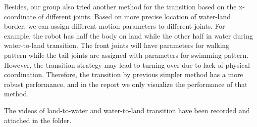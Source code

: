 \documentclass{cmc}
\begin{document}
Besides, our group also tried another method for the transition based on the x-coordinate of different joints. Based on more precise location of water-land border, we can assign different motion parameters to different joints. For example, the robot has half the body on land while the other half in water during water-to-land transition. The front joints will have parameters for walking pattern while the tail joints are assigned with parameters for swimming pattern. However, the transition strategy may lead to turning over due to lack of physical coordination. Therefore, the transition by previous simpler method has a more robust performance, and in the report we only visualize the performance of that method. 

The videos of land-to-water and water-to-land transition have been recorded and attached in the folder.


\label{sec:references}




\end{document}
